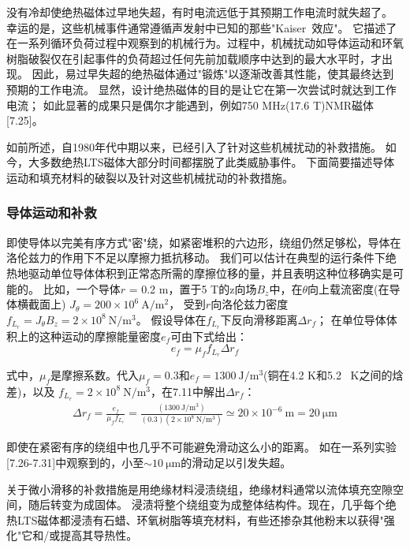 没有冷却使绝热磁体过早地失超，有时电流远低于其预期工作电流时就失超了。
幸运的是，这些机械事件通常遵循声发射中已知的那些"Kaiser~效应"。
它描述了在一系列循环负荷过程中观察到的机械行为。过程中，机械扰动如导体运动和环氧树脂破裂仅在引起事件的负荷超过任何先前加载顺序中达到的最大水平时，才出现。
因此，易过早失超的绝热磁体通过"锻炼"以逐渐改善其性能，使其最终达到预期的工作电流。
显然，设计绝热磁体的目的是让它在第一次尝试时就达到工作电流；
如此显著的成果只是偶尔才能遇到，例如750 MHz(17.6 T)NMR磁体[7.25]。

如前所述，自1980年代中期以来，已经引入了针对这些机械扰动的补救措施。
如今，大多数绝热LTS磁体大部分时间都摆脱了此类威胁事件。
下面简要描述导体运动和填充材料的破裂以及针对这些机械扰动的补救措施。

\subsubsection*{导体运动和补救}
即使导体以完美有序方式"密"绕，如紧密堆积的六边形，绕组仍然足够松，导体在洛伦兹力的作用下不足以摩擦力抵抗移动。
我们可以估计在典型的运行条件下绝热地驱动单位导体体积到正常态所需的摩擦位移的量，并且表明这种位移确实是可能的。
比如，一个导体$r$ = 0.2 m，置于5 T的z向场$B_z$中，在$\theta$向上载流密度(在导体横截面上)
$J_\theta= 200\times 10^6\ \mathrm{A/m^2}$，
受到$r$向洛伦兹力密度$f_{L_r} =J_\theta B_z=2\times 10^8\ \mathrm{N/m^3}$。
假设导体在$f_{L_r}$下反向滑移距离$\Delta r_f$；
在单位导体体积上的这种运动的摩擦能量密度$e_f$可由下式给出：
\begin{equation}%
e_f=\mu_ff_{L_r}\Delta r_f
\end{equation}

式中，$\mu_f$是摩擦系数。代入$\mu_f=0.3$和$e_f=1300\ \mathrm{J/m^3}$(铜在4.2 K和5.2~ K之间的焓差)，以及
$f_{L_r}=2\times 10^8\ \mathrm{N/m^3}$，在7.11中解出$\Delta r_f$：
\begin{align*}%
\Delta r_f=\frac{e_f}{\mu_ff_{L_r}}=\frac{(1300\ \mathrm{J/m^3})}{(0.3)(2\times 10^8\ \mathrm{N/m^3})}\simeq 20\times 10^{-6}\ \mathrm{m}=20\ \mathrm{\mu m}
\end{align*}

即使在紧密有序的绕组中也几乎不可能避免滑动这么小的距离。
如在一系列实验[7.26-7.31]中观察到的，小至$\sim 10\ \mathrm{\mu m}$的滑动足以引发失超。

关于微小滑移的补救措施是用绝缘材料浸渍绕组，绝缘材料通常以流体填充空隙空间，随后转变为成固体。
浸渍将整个绕组变为成整体结构件。现在，几乎每个绝热LTS磁体都浸渍有石蜡、环氧树脂等填充材料，有些还掺杂其他粉末以获得"强化"它和/或提高其导热性。
 
